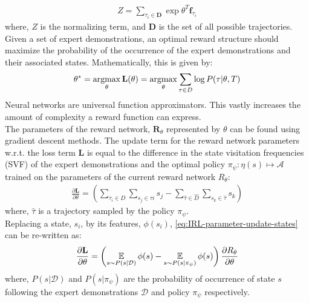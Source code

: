\begin{align}
Z = \sum_{\tau_{i}\in \mathbf{D}}\exp{\theta^{T}\mathbf{f}_{\tau_{i}}}
\end{align}
where, $Z$ is the normalizing term, and $\mathbf{D}$ is the set of all possible trajectories.\\
Given a set of expert demonstrations, an optimal reward structure should maximize the probability of the occurrence of the expert demonstrations and their associated states. Mathematically, this is given by: 
\begin{align}
\label{eq:loglikelihood-IRL}
\theta^{*} = \operatorname*{argmax}_{\theta} \mathbf{L}(\theta) = \operatorname*{argmax}_{\theta} \sum_{\tau \in D} \log{P(\tau| \theta, T)}
\end{align}
 Neural networks are universal function approximators. This vastly increases the amount of complexity a reward function can express.\\
The parameters of the reward network, $\mathbf{R}_{\theta}$ represented by $\theta$ can be found using gradient descent methods. The  update term for the reward network parameters w.r.t. the loss term $\mathbf{L}$ is equal to the difference in the state visitation frequencies (SVF) of the expert demonstrations and the optimal policy $\pi_{\psi} : \eta(s) \mapsto \mathcal{A} $ trained on the parameters of the current reward network $R_{\theta}$:
\begin{align}
	\label{eq:IRL-parameter-update-states}
	\frac{\partial \mathbf{L}}{\partial \theta} = \left(\sum_{\tau_{i} \in D}\sum_{s_{j} \in \tau{i}}s_{j} - \sum_{\hat{\tau} \in \hat{D}}\sum_{s_{k} \in \hat{\tau}}s_{k}\right)
\end{align}
where, $\hat{\tau}$ is a trajectory sampled by the policy $\pi_{\psi}$.\\
Replacing a state, $s_{i}$, by its features, $\phi(s_{i})$, \autoref{eq:IRL-parameter-update-states} can be re-written as:
\begin{align}
	\label{eq:IRL-parameter-update-features}
	\frac{\partial \mathbf{L}}{\partial \theta} = \left(\operatorname*{\mathbb{E}}_{s \sim P(s|\mathcal{D})} \phi(s) - \operatorname*{\mathbb{E}}_{s \sim P(s|\pi_\psi)} \phi(s)\right) \frac{\partial R_\theta}{\partial \theta} 
\end{align}
where, $P(s|\mathcal{D})$ and $P(s|\pi_{\psi})$ are the probability of occurrence of state $s$ following the expert demonstrations $\mathcal{D}$ and policy $\pi_{\psi}$ respectively.
